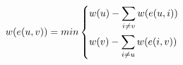 \begin{equation}
  \label{eqn:gmm}
  w(e(u,v)) = min 
  \begin{dcases} 
    w(u) - \sum_{i \ne v} w(e(u,i)) \\
    w(v) - \sum_{i \ne u} w(e(i,v)) 
  \end{dcases}    
\end{equation}